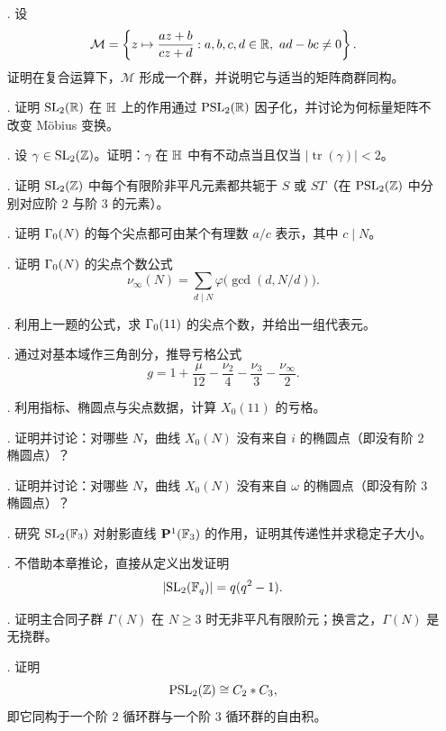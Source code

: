 \begin{enumerate}
  \item[\hard 51.] 设
  \[
  \mathcal M=\left\{z\mapsto \frac{az+b}{cz+d}:a,b,c,d\in\mathbb{R},\ ad-bc\ne 0\right\}.
  \]
  证明在复合运算下，$\mathcal M$ 形成一个群，并说明它与适当的矩阵商群同构。
  \item[\hard 52.] 证明 $\mathrm{SL}_2(\mathbb{R})$ 在 $\mathbb{H}$ 上的作用通过 $\mathrm{PSL}_2(\mathbb{R})$ 因子化，并讨论为何标量矩阵不改变 Möbius 变换。
  \item[\hard 53.] 设 $\gamma\in\mathrm{SL}_2(\mathbb{Z})$。证明：$\gamma$ 在 $\mathbb{H}$ 中有不动点当且仅当 $|\operatorname{tr}(\gamma)|<2$。
  \item[\hard 54.] 证明 $\mathrm{SL}_2(\mathbb{Z})$ 中每个有限阶非平凡元素都共轭于 $S$ 或 $ST$（在 $\mathrm{PSL}_2(\mathbb{Z})$ 中分别对应阶 $2$ 与阶 $3$ 的元素）。
  \item[\hard 55.] 证明 $\Gamma_0(N)$ 的每个尖点都可由某个有理数 $a/c$ 表示，其中 $c\mid N$。
  \item[\hard 56.] 证明 $\Gamma_0(N)$ 的尖点个数公式
  \[
  \nu_{\infty}(N)=\sum_{d\mid N}\varphi\bigl(\gcd(d,N/d)\bigr).
  \]
  \item[\hard 57.] 利用上一题的公式，求 $\Gamma_0(11)$ 的尖点个数，并给出一组代表元。
  \item[\hard 58.] 通过对基本域作三角剖分，推导亏格公式
  \[
  g=1+\frac{\mu}{12}-\frac{\nu_2}{4}-\frac{\nu_3}{3}-\frac{\nu_{\infty}}{2}.
  \]
  \item[\hard 59.] 利用指标、椭圆点与尖点数据，计算 $X_0(11)$ 的亏格。
  \item[\hard 60.] 证明并讨论：对哪些 $N$，曲线 $X_0(N)$ 没有来自 $i$ 的椭圆点（即没有阶 $2$ 椭圆点）？
  \item[\hard 61.] 证明并讨论：对哪些 $N$，曲线 $X_0(N)$ 没有来自 $\omega$ 的椭圆点（即没有阶 $3$ 椭圆点）？
  \item[\hard 62.] 研究 $\mathrm{SL}_2(\mathbb{F}_3)$ 对射影直线 $\mathbf P^1(\mathbb{F}_3)$ 的作用，证明其传递性并求稳定子大小。
  \item[\hard 63.] 不借助本章推论，直接从定义出发证明
  \[
  |\mathrm{SL}_2(\mathbb{F}_q)|=q(q^2-1).
  \]
  \item[\hard 64.] 证明主合同子群 $\Gamma(N)$ 在 $N\ge 3$ 时无非平凡有限阶元；换言之，$\Gamma(N)$ 是无挠群。
  \item[\hard 65.] 证明
  \[
  \mathrm{PSL}_2(\mathbb{Z})\cong C_2\ast C_3,
  \]
  即它同构于一个阶 $2$ 循环群与一个阶 $3$ 循环群的自由积。
\end{enumerate}
